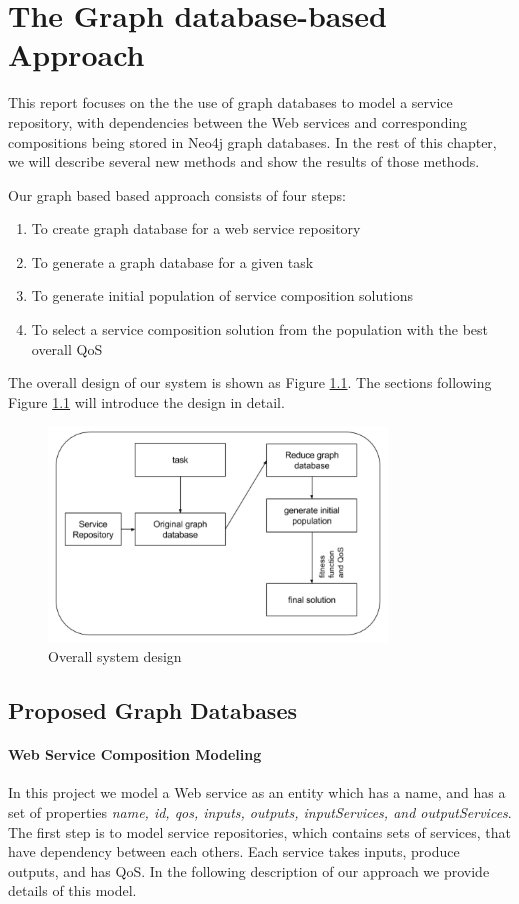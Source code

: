 \chapter{The Graph database-based Approach}\label{C:wd}
This report focuses on the the use of graph databases to model a service repository, with dependencies between the Web services and corresponding compositions being stored in Neo4j graph databases. In the rest of this chapter, we will describe several new methods and show the results of those methods.\par
Our graph based based approach consists of four steps:\par
\begin{enumerate}
  \item To create graph database for a web service repository
  \item To generate a graph database for a given task
  \item To generate initial population of service composition solutions
  \item To select a service composition solution from the population with the best overall QoS
\end{enumerate}

The overall design of our system is shown as Figure \ref{fig:process}. The sections following Figure \ref{fig:process} will introduce the design in detail.\par
\begin{figure}[H]
\includegraphics[width=9cm]{process.png}
\centering
\caption{Overall system design}
\label{fig:process} 
\end{figure} 

\section{Proposed Graph Databases} \label{procesedGD}
\subsubsection {Web Service Composition Modeling}
In this project we model a Web service as an entity which has a name, and has a set of properties \emph{name, id, qos, inputs, outputs, inputServices, and outputServices}. The first step is to model service repositories, which contains sets of services, that have dependency between each others. Each service takes inputs, produce outputs, and has QoS. In the following description of our approach we provide details of this model.\par
